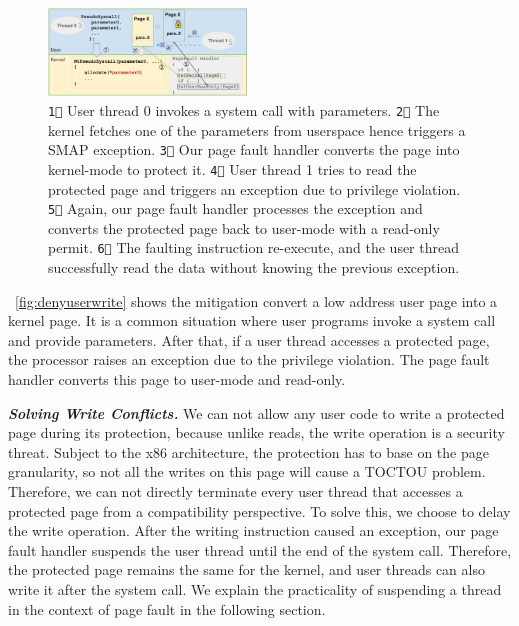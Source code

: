 \begin{figure}[th]
  \includegraphics[width=0.47\textwidth]{figures/denyuserwrite3}
  \centering
  \caption{\texttt{\textcircled{1}} User thread 0 invokes a system call with parameters. \texttt{\textcircled{2}} The kernel fetches one of the parameters from userspace hence triggers a SMAP exception. \texttt{\textcircled{3}} Our page fault handler converts the page into kernel-mode to protect it. \texttt{\textcircled{4}} User thread 1 tries to read the protected page and triggers an exception due to privilege violation.  \texttt{\textcircled{5}} Again, our page fault handler processes the exception and converts the protected page back to user-mode with a read-only permit. \texttt{\textcircled{6}} The faulting instruction re-execute, and the user thread successfully read the data without knowing the previous exception.}
  \label{fig:denyuserwrite}
\end{figure}



~\autoref{fig:denyuserwrite} shows the mitigation convert a low address user page into a kernel page. It is a common situation where user programs invoke a system call and provide parameters. After that, if a user thread accesses a protected page, the processor raises an exception due to the privilege violation. The page fault handler converts this page to user-mode and read-only.



\textbf{\textit{Solving Write Conflicts.}} We can not allow any user code to write a protected page during its protection,  because unlike reads, the write operation is a security threat. Subject to the x86 architecture, the protection has to base on the page granularity, so not all the writes on this page will cause a TOCTOU problem. Therefore, we can not directly terminate every user thread that accesses a protected page from a compatibility perspective. To solve this, we choose to delay the write operation. After the writing instruction caused an exception, our page fault handler suspends the user thread until the end of the system call. Therefore, the protected page remains the same for the kernel, and user threads can also write it after the system call.  We explain the practicality of suspending a thread in the context of page fault in the following section.


